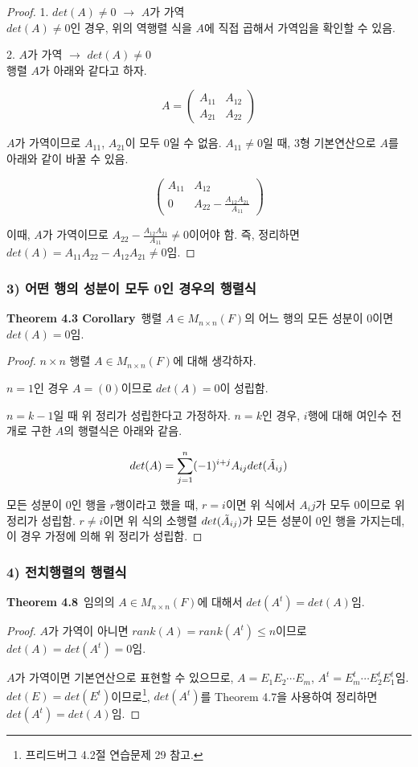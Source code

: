 \begin{proof}
1. $det(A) \neq 0$ $\rightarrow$ $A$가 가역\\
$det(A) \neq 0$인 경우, 위의 역행렬 식을 $A$에 직접 곱해서 가역임을 확인할 수 있음.

2. $A$가 가역 $\rightarrow$ $det(A) \neq 0$\\
행렬 $A$가 아래와 같다고 하자.

\[
A=
\begin{pmatrix}
A_{11} & A_{12}\\
A_{21} & A_{22}
\end{pmatrix}
\]

$A$가 가역이므로 $A_{11}$, $A_{21}$이 모두 0일 수 없음. $A_{11} \neq 0$일 때, 3형 기본연산으로 $A$를 아래와 같이 바꿀 수 있음.

\[
\begin{pmatrix}
A_{11} & A_{12}\\
0 & A_{22} - \frac{A_{12}A_{21}}{A_{11}}
\end{pmatrix}
\]

이때, $A$가 가역이므로 $A_{22} - \frac{A_{12}A_{21}}{A_{11}} \neq 0$이어야 함. 즉, 정리하면 $det(A)= A_{11}A_{22}-A_{12}A_{21} \neq 0$임.
\end{proof}


\subsubsection*{3) 어떤 행의 성분이 모두 0인 경우의 행렬식}
\textbf{Theorem 4.3 Corollary}\, 행렬 $A \in M_{n \times n}(F)$의 어느 행의 모든 성분이 0이면 $det(A)=0$임.

\begin{proof}
$n \times n$ 행렬 $A \in M_{n \times n}(F)$에 대해 생각하자.

$n=1$인 경우 $A=(0)$이므로 $det(A)=0$이 성립함.

$n=k-1$일 때 위 정리가 성립한다고 가정하자. $n=k$인 경우, $i$행에 대해 여인수 전개로 구한 $A$의 행렬식은 아래와 같음.

\[
det(A)=\sum^{n}_{j=1}(-1)^{i+j}A_{ij}det(\Tilde{A}_{ij})
\]

모든 성분이 0인 행을 $r$행이라고 했을 때, $r=i$이면 위 식에서 $A_ij$가 모두 0이므로 위 정리가 성립함. $r \neq i$이면 위 식의 소행렬 $det(\Tilde{A}_{ij})$가 모든 성분이 0인 행을 가지는데, 이 경우 가정에 의해 위 정리가 성립함.
\end{proof}

\subsubsection*{4) 전치행렬의 행렬식}
\textbf{Theorem 4.8}\, 임의의 $A \in M_{n \times n}(F)$에 대해서 $det(A^{t})=det(A)$임.

\begin{proof}
$A$가 가역이 아니면 $rank(A)=rank(A^{t}) \leq n$이므로 $det(A)=det(A^{t})=0$임.

$A$가 가역이면 기본연산으로 표현할 수 있으므로, $A=E_1E_2 \cdots E_m$, $A^{t}=E^{t}_{m} \cdots E^{t}_{2}E^{t}_{1}$임. $det(E)=det(E^{t})$이므로\footnote{프리드버그 4.2절 연습문제 29 참고.}, $det(A^{t})$를 Theorem 4.7을 사용하여 정리하면 $det(A^{t})=det(A)$임.
\end{proof}


\newpage
